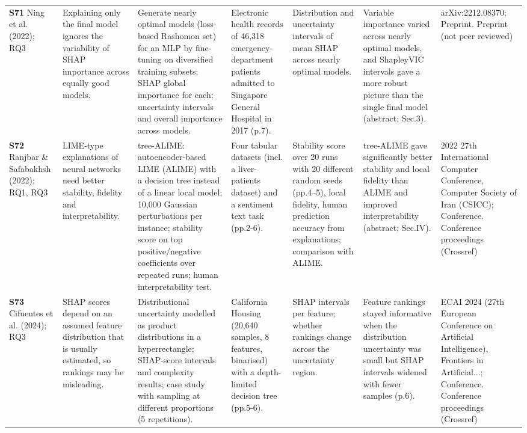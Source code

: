 \begin{longtable}{@{}P{1.55cm}P{2.9cm}P{4.5cm}P{3.2cm}P{3.4cm}P{4.6cm}P{3.6cm}@{}}
\textbf{S71} \cite{S71} Ning et al. (2022); RQ3 & Explaining only the final model ignores the variability of SHAP importance across equally good models. & Generate nearly optimal models (loss-based Rashomon set) for an MLP by fine-tuning on diversified training subsets; SHAP global importance for each; uncertainty intervals and overall importance across models. & Electronic health records of 46,318 emergency-department patients admitted to Singapore General Hospital in 2017 (p.7). & Distribution and uncertainty intervals of mean \textbar{}SHAP\textbar{} across nearly optimal models. & Variable importance varied across nearly optimal models, and ShapleyVIC intervals gave a more robust picture than the single final model (abstract; Sec.3). & arXiv:2212.08370; Preprint. Preprint (not peer reviewed) \\
\textbf{S72} \cite{S72} Ranjbar \& Safabakhsh (2022); RQ1, RQ3 & LIME-type explanations of neural networks need better stability, fidelity and interpretability. & tree-ALIME: autoencoder-based LIME (ALIME) with a decision tree instead of a linear local model; 10,000 Gaussian perturbations per instance; stability score on top positive/\allowbreak{}negative coefficients over repeated runs; human interpretability test. & Four tabular datasets (incl. a liver-patients dataset) and a sentiment text task (pp.2-6). & Stability score over 20 runs with 20 different random seeds (pp.4--5), local fidelity, human prediction accuracy from explanations; comparison with ALIME. & tree-ALIME gave significantly better stability and local fidelity than ALIME and improved interpretability (abstract; Sec.IV). & 2022 27th International Computer Conference, Computer Society of Iran (CSICC); Conference. Conference proceedings (Crossref) \\
\textbf{S73} \cite{S73} Cifuentes et al. (2024); RQ3 & SHAP scores depend on an assumed feature distribution that is usually estimated, so rankings may be misleading. & Distributional uncertainty modelled as product distributions in a hyperrectangle; SHAP-score intervals and complexity results; case study with sampling at different proportions (5 repetitions). & California Housing (20,640 samples, 8 features, binarised) with a depth-limited decision tree (pp.5-6). & SHAP intervals per feature; whether rankings change across the uncertainty region. & Feature rankings stayed informative when the distribution uncertainty was small but SHAP intervals widened with fewer samples (p.6). & ECAI 2024 (27th European Conference on Artificial Intelligence), Frontiers in Artificial...; Conference. Conference proceedings (Crossref) \\

\end{longtable}
